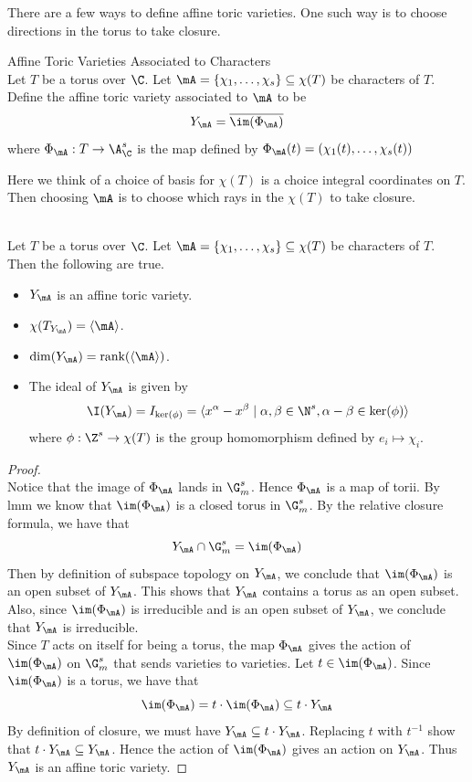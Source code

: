 \documentclass[a4paper]{article}
\begin{document}
There are a few ways to define affine toric varieties. One such way is to choose directions in the torus to take closure. 

\begin{defn}{Affine Toric Varieties Associated to Characters}{}\\
Let $T$ be a torus over $\C$. Let $\mA=\{\chi_1,\dots,\chi_s\}\subseteq\chi(T)$ be characters of $T$. Define the affine toric variety associated to $\mA$ to be $$Y_\mA=\overline{\im(\Phi_\mA)}$$ where $\Phi_\mA:T\to\A_\C^s$ is the map defined by $\Phi_\mA(t)=(\chi_1(t),\dots,\chi_s(t))$
\end{defn}

Here we think of a choice of basis for $\chi(T)$ is a choice integral coordinates on $T$. Then choosing $\mA$ is to choose which rays in the $\chi(T)$ to take closure. 

\begin{prp}{}{}\\
Let $T$ be a torus over $\C$. Let $\mA=\{\chi_1,\dots,\chi_s\}\subseteq\chi(T)$ be characters of $T$. Then the following are true. 
\begin{itemize}
\item $Y_\mA$ is an affine toric variety. 
\item $\chi(T_{Y_{\mA}})=\langle\mA\rangle$. 
\item $\dim(Y_\mA)=\text{rank}(\langle\mA\rangle)$. 
\item The ideal of $Y_\mA$ is given by $$\I(Y_\mA)=I_{\ker(\phi)}=\langle x^\alpha-x^\beta\;|\;\alpha,\beta\in\N^s, \alpha-\beta\in\ker(\phi)\rangle$$ where $\phi:\Z^s\to\chi(T)$ is the group homomorphism defined by $e_i\mapsto\chi_i$. 
\end{itemize}
\begin{proof}\\
Notice that the image of $\Phi_\mA$ lands in $\G_m^s$. Hence $\Phi_\mA$ is a map of torii. By lmm we know that $\im(\Phi_\mA)$ is a closed torus in $\G_m^s$. By the relative closure formula, we have that $$Y_\mA\cap\G_m^s=\im(\Phi_\mA)$$ Then by definition of subspace topology on $Y_\mA$, we conclude that $\im(\Phi_\mA)$ is an open subset of $Y_\mA$. This shows that $Y_\mA$ contains a torus as an open subset. Also, since $\im(\Phi_\mA)$ is irreducible and is an open subset of $Y_\mA$, we conclude that $Y_\mA$ is irreducible. \\

Since $T$ acts on itself for being a torus, the map $\Phi_\mA$ gives the action of $\im(\Phi_\mA)$ on $\G_m^s$ that sends varieties to varieties. Let $t\in\im(\Phi_\mA)$. Since $\im(\Phi_\mA)$ is a torus, we have that $$\im(\Phi_\mA)=t\cdot\im(\Phi_\mA)\subseteq t\cdot Y_\mA$$ By definition of closure, we must have $Y_\mA\subseteq t\cdot Y_\mA$. Replacing $t$ with $t^{-1}$ show that $t\cdot Y_\mA\subseteq Y_\mA$. Hence the action of $\im(\Phi_\mA)$ gives an action on $Y_\mA$. Thus $Y_\mA$ is an affine toric variety. 
\end{proof}
\end{prp}
\end{document}
